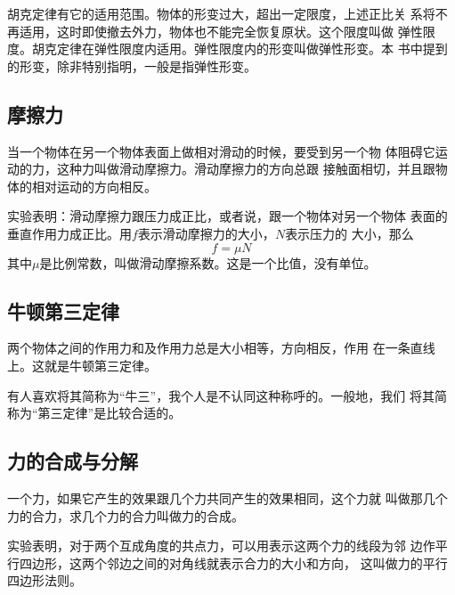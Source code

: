 胡克定律有它的适用范围。物体的形变过大，超出一定限度，上述正比关
系将不再适用，这时即使撤去外力，物体也不能完全恢复原状。这个限度叫做
弹性限度。胡克定律在弹性限度内适用。弹性限度内的形变叫做弹性形变。本
书中提到的形变，除非特别指明，一般是指弹性形变。

\subsection{摩擦力}
\begin{definition}
    当一个物体在另一个物体表面上做相对滑动的时候，要受到另一个物
    体阻碍它运动的力，这种力叫做滑动摩擦力。滑动摩擦力的方向总跟
    接触面相切，并且跟物体的相对运动的方向相反。
\end{definition}

\begin{theorem}
    实验表明：滑动摩擦力跟压力成正比，或者说，跟一个物体对另一个物体
    表面的垂直作用力成正比。用$f$表示滑动摩擦力的大小，$N$表示压力的
    大小，那么 
    \begin{equation}
        f=\mu N
    \end{equation}
    其中$\mu$是比例常数，叫做滑动摩擦系数。这是一个比值，没有单位。
\end{theorem}

\subsection{牛顿第三定律}
\begin{theorem}
    两个物体之间的作用力和及作用力总是大小相等，方向相反，作用
    在一条直线上。这就是牛顿第三定律。
\end{theorem}

有人喜欢将其简称为“牛三”，我个人是不认同这种称呼的。一般地，我们 
将其简称为“第三定律”是比较合适的。
\subsection{力的合成与分解}
\begin{definition}
    一个力，如果它产生的效果跟几个力共同产生的效果相同，这个力就
    叫做那几个力的合力，求几个力的合力叫做力的合成。
\end{definition}

\begin{theorem}
    实验表明，对于两个互成角度的共点力，可以用表示这两个力的线段为邻
    边作平行四边形，这两个邻边之间的对角线就表示合力的大小和方向，
    这叫做力的平行四边形法则。
\end{theorem}

